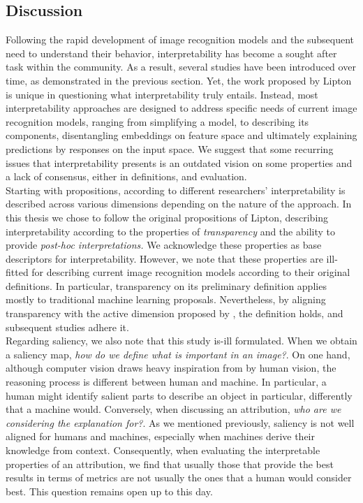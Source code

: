 \subsection{Discussion}
\label{sec:rel_interp_discussion}
Following the rapid development of image recognition models and the subsequent need to understand 
their behavior, interpretability has become a sought after task within the community. As a result, 
several studies have been introduced over time, as demonstrated in the previous section. Yet, the 
work proposed by Lipton is unique in questioning what interpretability truly entails. 
Instead, most interpretability approaches are designed to address specific needs of current image 
recognition models, ranging from simplifying a model, to describing its components, disentangling 
embeddings on feature space and ultimately explaining predictions by responses on the input space. 
We suggest that some recurring issues that interpretability presents is an outdated vision on some 
properties and a lack of consensus, either in definitions, and evaluation.\\

\noindent Starting with propositions, according to different researchers' interpretability is 
described across various dimensions depending on the nature of the approach. In this thesis we 
chose to follow the original propositions of Lipton, describing interpretability according to the 
properties of \emph{transparency} and the ability to provide \emph{post-hoc interpretations.} We 
acknowledge these properties as base descriptors for interpretability. However, we note that these 
properties are ill-fitted for describing current image recognition models according 
to their original definitions. In particular, transparency on its preliminary definition applies 
mostly to traditional machine learning proposals. Nevertheless, by aligning transparency with 
the active dimension proposed by \cite{zhang2021survey}, the definition holds, and subsequent 
studies adhere it.\\

\noindent Regarding saliency, we also note that this study is-ill formulated. When we obtain a 
saliency map, \emph{how do we define what is important in an image?}. On one hand, although computer  
vision draws heavy inspiration from by human vision, the reasoning process is different between 
human and machine. In particular, a human might identify salient parts to describe an object in 
particular, differently that a machine would. Conversely, when discussing an attribution, 
\emph{who are we considering the explanation for?}. As we mentioned previously, saliency is not 
well aligned for humans and machines, especially when machines derive their knowledge from context. 
Consequently, when evaluating the interpretable properties of an attribution, we find that usually 
those that provide the best results in terms of metrics are not usually the ones that a human 
would consider best. This question remains open up to this day.\\

